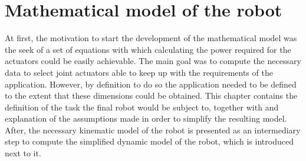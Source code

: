 \chapter{Mathematical model of the robot} %
\label{cha:mathematical_model}

At first, the motivation to start the development of the mathematical model was the seek of a set of equations with which calculating the power required for the actuators could be easily achievable.
The main goal was to compute the necessary data to select joint actuators able to keep up with the requirements of the application.
However, by definition to do so the application needed to be defined to the extent that these dimensions could be obtained.
This chapter contains the definition of the task the final robot would be subject to, together with and explanation of the assumptions made in order to simplify the resulting model. 
After, the necessary kinematic model of the robot is presented as an intermediary step to compute the simplified dynamic model of the robot, which is introduced next to it.







